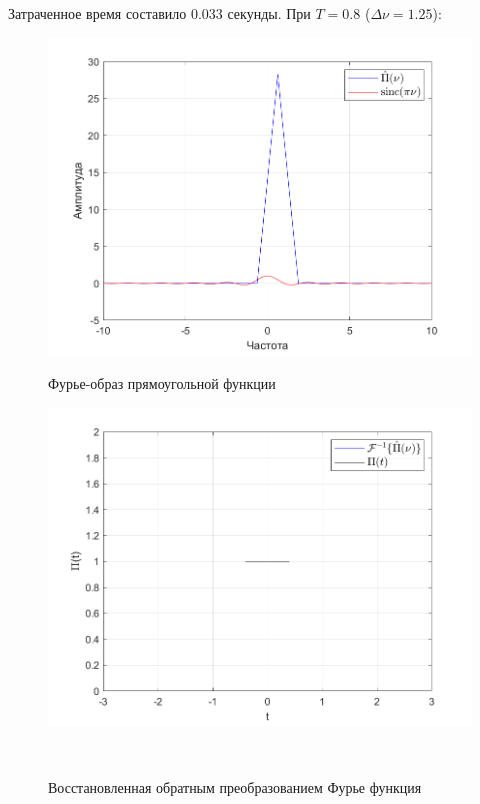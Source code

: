\documentclass[a4paper]{article}
\begin{document}
Затраченное время составило 0.033 секунды. При $T = 0.8$ ($\Delta \nu = 1.25$):

\begin{figure}[H]
    \begin{minipage}{0.5\textwidth}
        \centering \includegraphics[width=\textwidth]{graphs/2/T_0.8_dt_0.001_V_1000_dv_1.25/fourier_numerical.png}
        \caption{Фурье-образ прямоугольной функции}
    \end{minipage}\hfill
    \begin{minipage}{0.5\textwidth}
        \centering \includegraphics[width=\textwidth]{graphs/2/T_0.8_dt_0.001_V_1000_dv_1.25/func_inversed_fourier.png}
        \caption{Восстановленная обратным преобразованием Фурье функция}
    \end{minipage}\\[1em]
\end{figure}\noindent\
\end{document}
